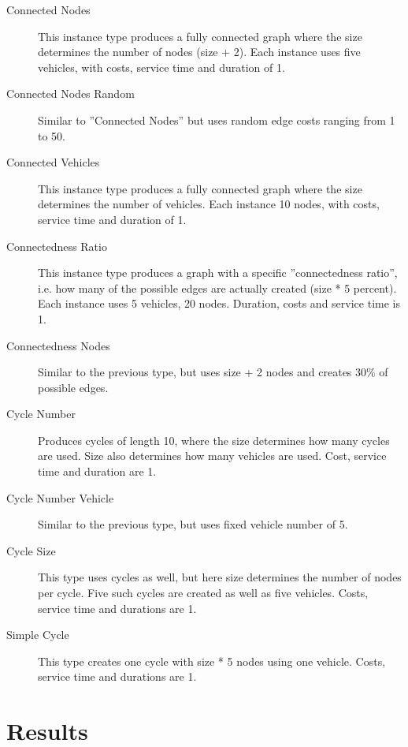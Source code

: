\documentclass[12pt, letterpaper]{article}
\begin{document}
\begin{description}

\item[Connected Nodes]
This instance type produces a fully connected graph where the size determines the number of nodes (size + 2). Each instance uses five vehicles, with costs, service time and duration of 1.

\item[Connected Nodes Random]
Similar to ''Connected Nodes'' but uses random edge costs ranging from 1 to 50.

\item[Connected Vehicles]
This instance type produces a fully connected graph where the size determines the number of vehicles. Each instance 10 nodes, with costs, service time and duration of 1.

\item[Connectedness Ratio]
This instance type produces a graph with a specific ''connectedness ratio'', i.e. how many of the possible edges are actually created (size * 5 percent). Each instance uses 5 vehicles, 20 nodes. Duration, costs and service time is 1.

\item[Connectedness Nodes]
Similar to the previous type, but uses size + 2 nodes and creates 30\% of possible edges.

\item[Cycle Number]
Produces cycles of length 10, where the size determines how many cycles are used. Size also determines how many vehicles are used. Cost, service time and duration are 1.

\item[Cycle Number Vehicle]
Similar to the previous type, but uses fixed vehicle number of 5.

\item[Cycle Size]
This type uses cycles as well, but here size determines the number of nodes per cycle. Five such cycles are created as well as five vehicles. Costs, service time and durations are 1.

\item[Simple Cycle]
This type creates one cycle with size * 5 nodes using one vehicle. Costs, service time and durations are 1.

\end{description}


\section{Results}
\end{document}

